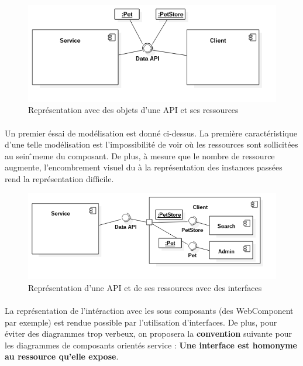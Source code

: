         \begin{figure}[h]
            \centering
            \includegraphics[scale=0.6]{./assets/UML/component1.png}
            \caption{Représentation avec des objets d'une API et ses ressources}
        \end{figure}

        \paragraph{}
            Un premier éssai de modélisation est donné ci-dessus. La première caractéristique d'une telle
            modélisation est l'impossibilité de voir où les ressources sont sollicitées au sein ̂meme
            du composant. De plus, à mesure que le nombre de ressource augmente,  l'encombrement visuel
            du à la représentation des instances passées rend la représentation difficile.

        \begin{figure}[h]
            \centering
            \includegraphics[scale=0.6]{./assets/UML/component3.png}
            \caption{Représentation d'une API et de ses ressources avec des interfaces}
        \end{figure}

        \paragraph{}
            La représentation de l'intéraction avec les sous composants (des WebComponent par exemple)
            est rendue possible par l'utilisation d'interfaces. De plus, pour éviter des diagrammes
            trop verbeux, on proposera la \textbf{convention} suivante pour les diagrammes de composants
            orientés service : \textbf{Une interface est homonyme au ressource qu'elle expose}.


